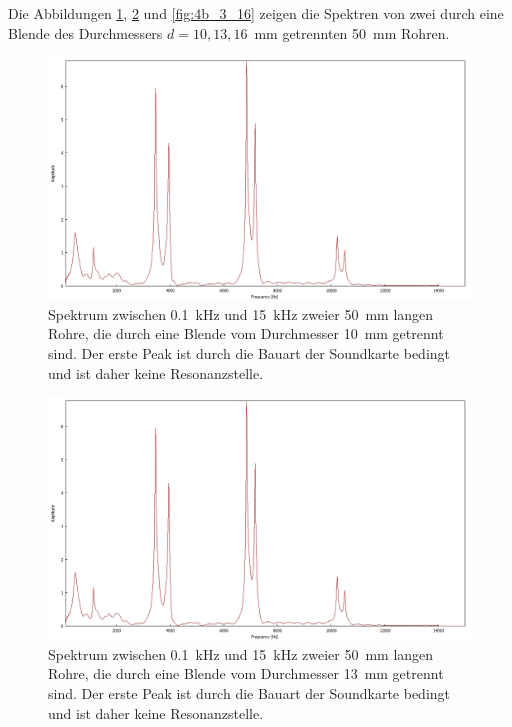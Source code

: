\noindent Die Abbildungen \ref{fig:4b_3_10}, \ref{fig:4b_3_13} und \ref{fig:4b_3_16}  zeigen die Spektren von zwei durch eine Blende des Durchmessers $d=10,13,16$~mm getrennten 50~mm Rohren.
\begin{figure}
\centering
\includegraphics[width=\textwidth]{content/messungen/Chapter4b/4b_3_10.jpg}
\caption{Spektrum zwischen 0.1~kHz und 15~kHz zweier 50~mm langen Rohre, die durch eine Blende vom Durchmesser 10~mm getrennt sind. Der erste Peak ist durch die Bauart der Soundkarte bedingt und ist daher keine Resonanzstelle.}
\label{fig:4b_3_10}
\end{figure}
\begin{figure}
\centering
\includegraphics[width=\textwidth]{content/messungen/Chapter4b/4b_3_10.jpg}
\caption{Spektrum zwischen 0.1~kHz und 15~kHz zweier 50~mm langen Rohre, die durch eine Blende vom Durchmesser 13~mm getrennt sind. Der erste Peak ist durch die Bauart der Soundkarte bedingt und ist daher keine Resonanzstelle.}
\label{fig:4b_3_13}
\end{figure}

